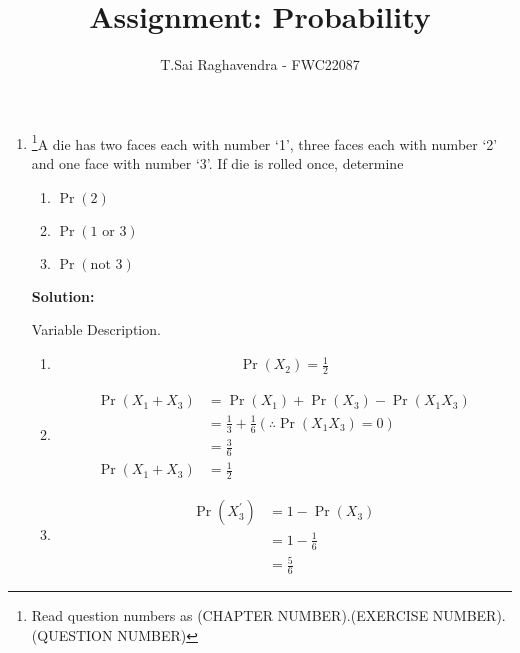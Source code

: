 \documentclass{article}
\providecommand{\pr}[1]{\ensuremath{\Pr\left(#1\right)}}
\newcommand{\solution}{\noindent \textbf{Solution: }}
\begin{document}
\title{Assignment: Probability}
\author{\Large T.Sai Raghavendra - FWC22087}
\date{}


\maketitle
\begin{enumerate}[label=16.\arabic{enumi}.\arabic{enumii}]%
\setcounter{enumi}{3}
\setcounter{enumii}{3}

\item \footnote{Read question numbers as (CHAPTER NUMBER).(EXERCISE NUMBER).(QUESTION NUMBER)}A die has two faces each with number ‘1’, three faces each with number ‘2’ and one face with number ‘3’. If die is rolled once, determine
\begin{enumerate}
\item $\pr{2}$
\item $\pr{1 \text{ or } 3}$
\item $\pr{\text{not } 3}$
\end{enumerate}

\solution
	\begin{table}[H]
	\centering 
	
	\caption{Variable Description.}
	\label{tables:16.4.3.2}
	\end{table}

\begin{enumerate}
\item \begin{align}
\pr{X_2} = \frac{1}{2}  %
\end{align}	
\item 
\begin{align}
\pr{X_1 + X_3}	&= \pr{X_1} + \pr{X_3} - \pr{X_1X_3}\\
				&= \frac{1}{3} + \frac{1}{6}   (\therefore \pr{X_1X_3} = 0)\\
				&= \frac{3}{6}\\
\pr{X_1 + X_3} 	&= \frac{1}{2}
\end{align}
\item 
\begin{align}
\pr{X_3^{\prime}} &= 1 - \pr{X_3}\\
			   &= 1 - \frac{1}{6}\\
			   &= \frac{5}{6}
\end{align}
\end{enumerate}
\end{enumerate}
\end{document}
